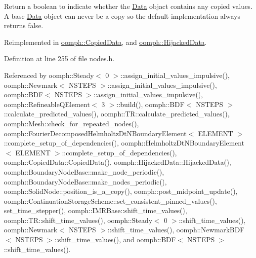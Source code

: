 Return a boolean to indicate whether the \hyperlink{classoomph_1_1Data}{Data} objact contains any copied values. A base \hyperlink{classoomph_1_1Data}{Data} object can never be a copy so the default implementation always returns false. 



Reimplemented in \hyperlink{classoomph_1_1CopiedData_ac76cb0c286daa39b501bff9ef82bb05c}{oomph\+::\+Copied\+Data}, and \hyperlink{classoomph_1_1HijackedData_ad392e7561212e3196d05a35417697112}{oomph\+::\+Hijacked\+Data}.



Definition at line 255 of file nodes.\+h.



Referenced by oomph\+::\+Steady$<$ 0 $>$\+::assign\+\_\+initial\+\_\+values\+\_\+impulsive(), oomph\+::\+Newmark$<$ N\+S\+T\+E\+P\+S $>$\+::assign\+\_\+initial\+\_\+values\+\_\+impulsive(), oomph\+::\+B\+D\+F$<$ N\+S\+T\+E\+P\+S $>$\+::assign\+\_\+initial\+\_\+values\+\_\+impulsive(), oomph\+::\+Refineable\+Q\+Element$<$ 3 $>$\+::build(), oomph\+::\+B\+D\+F$<$ N\+S\+T\+E\+P\+S $>$\+::calculate\+\_\+predicted\+\_\+values(), oomph\+::\+T\+R\+::calculate\+\_\+predicted\+\_\+values(), oomph\+::\+Mesh\+::check\+\_\+for\+\_\+repeated\+\_\+nodes(), oomph\+::\+Fourier\+Decomposed\+Helmholtz\+Dt\+N\+Boundary\+Element$<$ E\+L\+E\+M\+E\+N\+T $>$\+::complete\+\_\+setup\+\_\+of\+\_\+dependencies(), oomph\+::\+Helmholtz\+Dt\+N\+Boundary\+Element$<$ E\+L\+E\+M\+E\+N\+T $>$\+::complete\+\_\+setup\+\_\+of\+\_\+dependencies(), oomph\+::\+Copied\+Data\+::\+Copied\+Data(), oomph\+::\+Hijacked\+Data\+::\+Hijacked\+Data(), oomph\+::\+Boundary\+Node\+Base\+::make\+\_\+node\+\_\+periodic(), oomph\+::\+Boundary\+Node\+Base\+::make\+\_\+nodes\+\_\+periodic(), oomph\+::\+Solid\+Node\+::position\+\_\+is\+\_\+a\+\_\+copy(), oomph\+::post\+\_\+midpoint\+\_\+update(), oomph\+::\+Continuation\+Storage\+Scheme\+::set\+\_\+consistent\+\_\+pinned\+\_\+values(), set\+\_\+time\+\_\+stepper(), oomph\+::\+I\+M\+R\+Base\+::shift\+\_\+time\+\_\+values(), oomph\+::\+T\+R\+::shift\+\_\+time\+\_\+values(), oomph\+::\+Steady$<$ 0 $>$\+::shift\+\_\+time\+\_\+values(), oomph\+::\+Newmark$<$ N\+S\+T\+E\+P\+S $>$\+::shift\+\_\+time\+\_\+values(), oomph\+::\+Newmark\+B\+D\+F$<$ N\+S\+T\+E\+P\+S $>$\+::shift\+\_\+time\+\_\+values(), and oomph\+::\+B\+D\+F$<$ N\+S\+T\+E\+P\+S $>$\+::shift\+\_\+time\+\_\+values().

\mbox{\label{classoomph_1_1Data_ae31cff2285588c40cd33fac0cabcc371}} 
